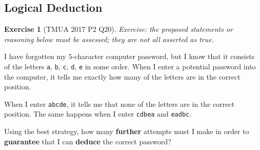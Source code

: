 \documentclass[11pt]{article}
\theoremstyle{definition}
\newtheorem{example}[theorem]{Exercise}
\theoremstyle{remark}
\begin{document}
\subsection{Logical Deduction}\label{tmua-5-subsection-007}

\begin{example}[TMUA 2017 P2 Q20]\label{tmua-5-unit-015}
\textit{Exercise: the proposed statements or reasoning below must be assessed; they are not all asserted as true.}\par

    I have forgotten my \(5\)-character computer password, but I know that it consists of the letters \texttt{a}, \texttt{b}, \texttt{c}, \texttt{d}, \texttt{e} in some order. When I enter a potential password into the computer, it tells me exactly how many of the letters are in the correct position.

    When I enter \texttt{abcde}, it tells me that none of the letters are in the correct position. The same happens when I enter \texttt{cdbea} and \texttt{eadbc}.

    Using the best strategy, how many \textbf{further} attempts must I make in order to \textbf{guarantee} that I can \textbf{deduce} the correct password?
\end{example}
\end{document}
